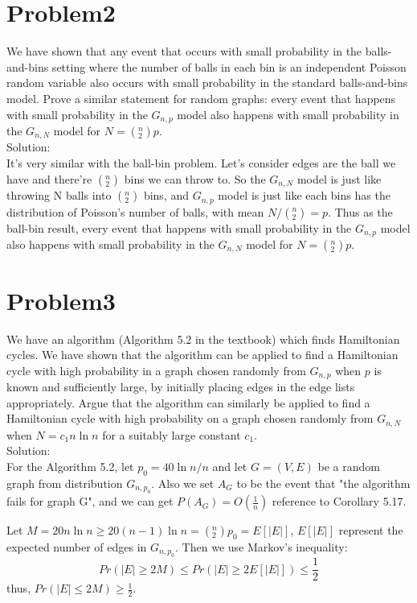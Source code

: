 \documentclass[12pt]{article}
\begin{document}
\section{Problem2}
We have shown that any event that occurs with small probability in the balls-and-bins setting where the number of balls in each bin is an independent Poisson random variable also occurs with small probability in the standard balls-and-bins model. Prove a similar statement for random graphs: every event that happens with small probability in the $G_{n,p}$ model also happens with small probability in the $G_{n,N}$ model for $N = ({}^n_2)p$.\\

Solution:\\
It's very similar with the ball-bin problem. Let's consider edges are the ball we have and there're $({}^n_2)$ bins we can throw to. So the $G_{n,N}$ model is just like throwing N balls into $({}^n_2)$ bins, and $G_{n,p}$ model is just like each bins has the distribution of Poisson's number of balls, with mean $N/({}^n_2)=p$. Thus as the ball-bin result, every event that happens with small probability in the $G_{n,p}$ model also happens with small probability in the $G_{n,N}$ model for $N = ({}^n_2)p$.

\section{Problem3}
We have an algorithm (Algorithm 5.2 in the textbook) which finds Hamiltonian cycles. We have shown that the algorithm can be applied to find a Hamiltonian cycle with high probability in a graph chosen randomly from $G_{n,p}$ when $p$ is known and sufficiently large, by initially placing edges in the edge lists appropriately. Argue that the algorithm can similarly be applied to find a Hamiltonian cycle with high probability on a graph chosen randomly from $G_{n,N}$ when $N = c_1n \ln n$ for a suitably large constant $c_1$.\\

Solution:\\
For the Algorithm 5.2, let $p_0=40\ln n / n$ and let $G=(V,E)$ be a random graph from distribution $G_{n,p_0}$. Also we set $A_G$ to be the event that "the algorithm fails for graph G", and we can get $P(A_G)=O(\frac{1}{n})$ reference to Corollary 5.17.

Let $M=20n \ln n \ge 20(n-1)\ln n=({}^n_2)p_0=E[|E|]$, $E[|E|]$ represent the expected number of edges in $G_{n,p_0}$. Then we use Markov's inequality:
\begin{equation}
    Pr(|E| \ge 2M) \le Pr(|E| \ge 2E[|E|]) \le \frac{1}{2}
\end{equation}
thus, $Pr(|E| \le 2M) \ge \frac{1}{2}$.
\end{document}
